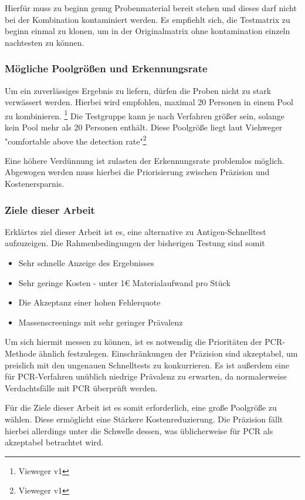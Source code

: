 Hierfür muss zu beginn genug Probenmaterial bereit stehen und dieses darf nicht bei der Kombination kontaminiert werden.
Es empfiehlt sich, die Testmatrix zu beginn einmal zu klonen, um in der Originalmatrix ohne kontamination einzeln nachtesten zu können.

\subsubsection{Mögliche Poolgrößen und Erkennungsrate}
Um ein zuverlässiges Ergebnis zu liefern, dürfen die Proben nicht zu stark verwässert werden.
Hierbei wird empfohlen, maximal 20 Personen in einem Pool zu kombinieren. \footnote{Vieweger v1}
Die Testgruppe kann je nach Verfahren größer sein, solange kein Pool mehr als 20 Personen enthält.
Diese Poolgröße liegt laut Viehweger "comfortable above the detection rate"\footnote{Vieweger v1}

Eine höhere Verdünnung ist zulasten der Erkennungsrate problemlos möglich.
Abgewogen werden muss hierbei die Priorisierung zwischen Präzision und Kostenersparnis.

\subsubsection{Ziele dieser Arbeit}
Erklärtes ziel dieser Arbeit ist es, eine alternative zu Antigen-Schnelltest aufzuzeigen.
Die Rahmenbedingungen der bisherigen Testung sind somit
\begin{itemize}
	\item Sehr schnelle Anzeige des Ergebnisses
	\item Sehr geringe Kosten - unter 1€ Materialaufwand pro Stück
	\item Die Akzeptanz einer hohen Fehlerquote
	\item Massenscreenings mit sehr geringer Prävalenz
\end{itemize}
	
Um sich hiermit messen zu können, ist es notwendig die Prioritäten der PCR-Methode ähnlich festzulegen.
Einschränkungen der Präzision sind akzeptabel, um preislich mit den ungenauen Schnelltests zu konkurrieren.
Es ist außerdem eine für PCR-Verfahren unüblich niedrige Prävalenz zu erwarten, da normalerweise Verdachtsfälle mit PCR überprüft werden.

Für die Ziele dieser Arbeit ist es somit erforderlich, eine große Poolgröße zu wählen.
Diese ermöglicht eine Stärkere Kostenreduzierung.
Die Präzision fällt hierbei allerdings unter die Schwelle dessen, was üblicherweise für PCR als akzeptabel betrachtet wird.

